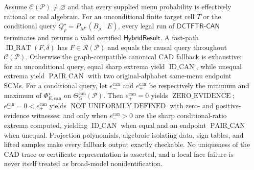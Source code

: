 Assume \(\mathcal C(\mathcal P)\ne\varnothing\) and that every supplied menu probability is effectively rational or real algebraic.  For an unconditional finite target cell \(T\) or the conditional query \(Q_\rho^\star=P_{M^\star}(B_\rho\mid E)\), every legal run of \(\mathsf{DCTFTR\text{-}CAN}\) terminates and returns a valid certified \(\mathsf{HybridResult}\).  A fast-path \(\operatorname{ID\_RAT}(F,\delta)\) has \(F\in\mathscr R(\mathcal P)\) and equals the causal query throughout \(\mathcal C(\mathcal P)\).  Otherwise the graph-compatible canonical CAD fallback is exhaustive: for an unconditional query, equal sharp extrema yield \(\operatorname{ID\_CAN}\), while unequal extrema yield \(\operatorname{PAIR\_CAN}\) with two original-alphabet same-menu endpoint SCMs.  For a conditional query, let \(e_-^{\mathrm{can}}\) and \(e_+^{\mathrm{can}}\) be respectively the minimum and maximum of \(\Phi_{E,\mathrm{can}}^\star\) on \(\Theta_G^{\mathrm{can}}(\mathcal P)\).  Then \(e_+^{\mathrm{can}}=0\) yields \(\operatorname{ZERO\_EVIDENCE}\); \(e_-^{\mathrm{can}}=0<e_+^{\mathrm{can}}\) yields \(\operatorname{NOT\_UNIFORMLY\_DEFINED}\) with zero- and positive-evidence witnesses; and only when \(e_-^{\mathrm{can}}>0\) are the sharp conditional-ratio extrema computed, yielding \(\operatorname{ID\_CAN}\) when equal and an endpoint \(\operatorname{PAIR\_CAN}\) when unequal.  Projection polynomials, algebraic isolating data, sign tables, and lifted samples make every fallback output exactly checkable.  No uniqueness of the CAD trace or certificate representation is asserted, and a local face failure is never itself treated as broad-model nonidentification.